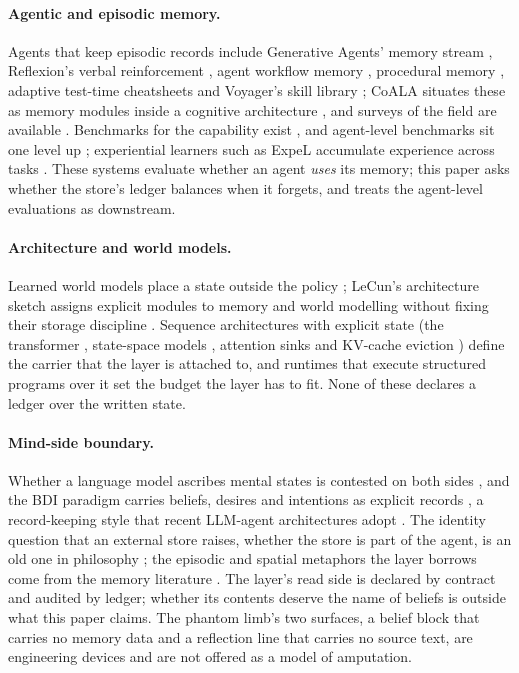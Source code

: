 \documentclass[11pt,a4paper]{article}
\begin{document}
\paragraph{Agentic and episodic memory.}
Agents that keep episodic records include Generative Agents' memory stream \citep{genagents2023}, Reflexion's verbal reinforcement \citep{reflexion2023}, agent workflow memory \citep{awm2025}, procedural memory \citep{memp2026}, adaptive test-time cheatsheets \citep{cheatsheet2026} and Voyager's skill library \citep{voyager2024}; CoALA situates these as memory modules inside a cognitive architecture \citep{coala2024}, and surveys of the field are available \citep{memsurvey2025,human2ai2025,memorysurvey2026}. Benchmarks for the capability exist \citep{membench2025,mab2026,longmemeval2025,locomo2024}, and agent-level benchmarks sit one level up \citep{agentbench2024}; experiential learners such as ExpeL accumulate experience across tasks \citep{expel2024}. These systems evaluate whether an agent \emph{uses} its memory; this paper asks whether the store's ledger balances when it forgets, and treats the agent-level evaluations as downstream.

\paragraph{Architecture and world models.}
Learned world models place a state outside the policy \citep{worldmodels2018,dreamerv3,genie2024,cosmos2025,muzero2020,vjepa2024}; LeCun's architecture sketch assigns explicit modules to memory and world modelling without fixing their storage discipline \citep{lecun2022}. Sequence architectures with explicit state (the transformer \citep{transformer2017}, state-space models \citep{mamba2023}, attention sinks and KV-cache eviction \citep{streamingllm2024,h2o2023}) define the carrier that the layer is attached to, and runtimes that execute structured programs over it \citep{sglang2024} set the budget the layer has to fit. None of these declares a ledger over the written state.

\paragraph{Mind-side boundary.}
Whether a language model ascribes mental states is contested on both sides \citep{kosinski2023,ullman2023,strachan2024}, and the BDI paradigm carries beliefs, desires and intentions as explicit records \citep{bdi2025}, a record-keeping style that recent LLM-agent architectures adopt \citep{frering2025,unifiedmind2025}. The identity question that an external store raises, whether the store is part of the agent, is an old one in philosophy \citep{parfit1984,clark1998}; the episodic and spatial metaphors the layer borrows come from the memory literature \citep{tulving2002,okeefe1979}. The layer's read side is declared by contract and audited by ledger; whether its contents deserve the name of beliefs is outside what this paper claims. The phantom limb's two surfaces, a belief block that carries no memory data and a reflection line that carries no source text, are engineering devices and are not offered as a model of amputation.
\end{document}
